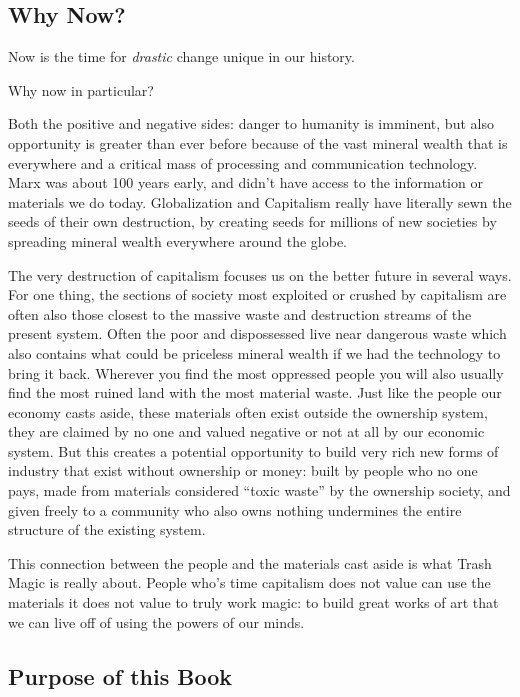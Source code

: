 \subsection{Why Now?}\label{why-now}

Now is the time for \emph{drastic} change unique in our history.

Why now in particular?

Both the positive and negative sides: danger to humanity is imminent,
but also opportunity is greater than ever before because of the vast
mineral wealth that is everywhere and a critical mass of processing and
communication technology. Marx was about 100 years early, and didn't
have access to the information or materials we do today. Globalization
and Capitalism really have literally sewn the seeds of their own
destruction, by creating seeds for millions of new societies by
spreading mineral wealth everywhere around the globe.

The very destruction of capitalism focuses us on the better future in
several ways. For one thing, the sections of society most exploited or
crushed by capitalism are often also those closest to the massive waste
and destruction streams of the present system. Often the poor and
dispossessed live near dangerous waste which also contains what could be
priceless mineral wealth if we had the technology to bring it back.
Wherever you find the most oppressed people you will also usually find
the most ruined land with the most material waste. Just like the people
our economy casts aside, these materials often exist outside the
ownership system, they are claimed by no one and valued negative or not
at all by our economic system. But this creates a potential opportunity
to build very rich new forms of industry that exist without ownership or
money: built by people who no one pays, made from materials considered
``toxic waste'' by the ownership society, and given freely to a
community who also owns nothing undermines the entire structure of the
existing system.

This connection between the people and the materials cast aside is what
Trash Magic is really about. People who's time capitalism does not value
can use the materials it does not value to truly work magic: to build
great works of art that we can live off of using the powers of our
minds.

\subsection{Purpose of this Book}\label{purpose-of-this-book}

